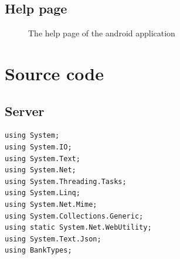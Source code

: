 \documentclass[11pt, a4paper]{article}
\begin{document}
\begin{appendices}
\subsection{Help page} %
\begin{figure}[ht]
\centering
{}
\caption{The help page of the android application}
\end{figure}
\clearpage


\section{Source code}
\subsection{Server} %
\label{sub:server}
\begin{lstlisting}
using System;
using System.IO;
using System.Text;
using System.Net;
using System.Threading.Tasks;
using System.Linq;
using System.Net.Mime;
using System.Collections.Generic;
using static System.Net.WebUtility;
using System.Text.Json;
using BankTypes;


\end{lstlisting}
\end{appendices}
\end{document}
